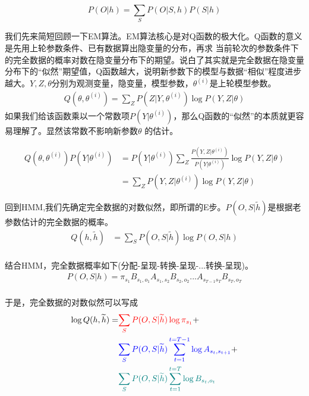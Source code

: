 \documentclass[]{article}
\begin{document}
	\begin{equation}
		P(O|h)=\sum_{S}P(O|S,h)P(S|h)
	\end{equation} 

    我们先来简短回顾一下EM算法。EM算法核心是对Q函数的极大化。Q函数的意义是先用上轮参数条件、已有数据算出隐变量的分布，再求
    当前轮次的参数条件下的完全数据的概率对数在隐变量分布下的期望。说白了其实就是完全数据在隐变量分布下的“似然”期望值，Q函数越大，说明新参数下的模型与数据“相似”程度进步越大。$Y,Z,\theta$分别为观测变量，隐变量，模型参数，$\theta^{(i)}$是上轮模型参数。
    \begin{equation}
    	\begin{aligned}
    		Q(\theta, \theta^{(i)})=\sum_{Z}P(Z|Y,\theta^{(i)})\log{P(Y,Z|\theta)}
    	\end{aligned}
    \end{equation}
    如果我们给该函数乘以一个常数项$P(Y|\theta^{(i)})$，那么Q函数的“似然”的本质就更容易理解了。显然该常数不影响新参数$\theta$
    的估计。
    
    \begin{equation}
    	\begin{aligned}
    		Q(\theta, \theta^{(i)})P(Y|\theta^{(i)})&=P(Y|\theta^{(i)})\sum_{Z}\frac{P(Y,Z|\theta^{(i)})}{P(Y|\theta^{(i)})}\log{P(Y,Z|\theta)}\\
    		&=\sum_{Z}P(Y,Z|\theta^{(i)})\log{P(Y,Z|\theta)}
    	\end{aligned}
    \end{equation}
    

    回到HMM,我们先确定完全数据的对数似然，即所谓的E步。$P(O,S|\widetilde{h})$是根据老参数估计的完全数据的概率。
	\begin{equation}
		\begin{aligned}
			Q(h,\widetilde{h})
			&=\sum_{S}P(O,S|\widetilde{h})\log{P(O,S|h)}\\
		\end{aligned}
	\end{equation}
    
    结合HMM，完全数据概率如下(分配-呈现-转换-呈现-...转换-呈现)。
	\begin{equation}
	\begin{aligned}
		P(O,S|h)=\pi_{s_{1}}B_{s_{1},o_{1}}A_{s_{1},s_{2}}B_{s_{2},o_{2}}...A_{s_{T-1}s_{T}}B_{s_{T},o_{T}}\\
	\end{aligned}
	\end{equation}

    于是，完全数据的对数似然可以写成
   	\begin{equation}\label{eq.log.likelihood}
   	\begin{aligned}
   		\log{Q(h,\widetilde{h})}=&\textcolor{red}{\sum_{S}P(O,S|\widetilde{h})\log{\pi_{s_{1}}}}+\\
   		                         &\textcolor{blue}{\sum_{S}P(O,S|\widetilde{h})\sum_{t=1}^{t=T-1}\log{A_{s_{t},s_{t+1}}}}+\\
   		                         &\textcolor{teal}{\sum_{S}P(O,S|\widetilde{h})\sum_{t=1}^{t=T}\log{B_{s_{t},o_{t}}}}    
   	\end{aligned}
   \end{equation}  
   
\end{document}
